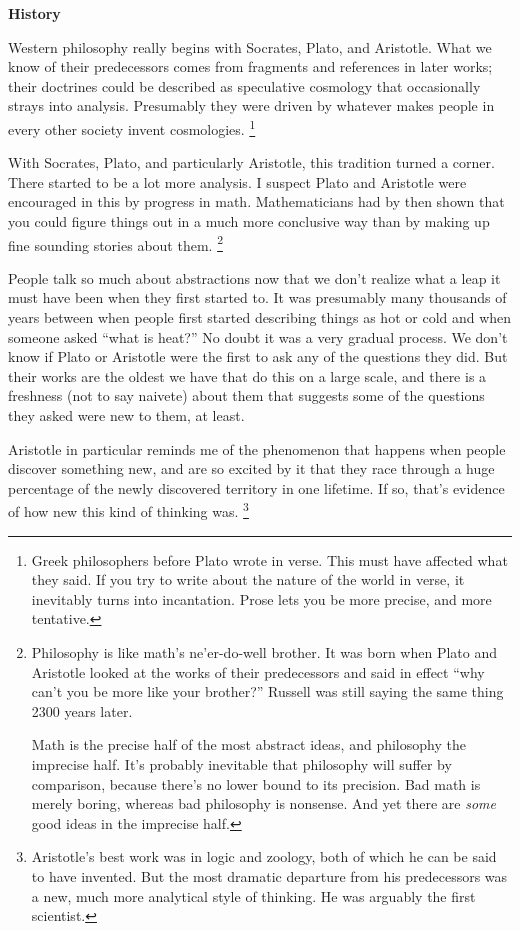 \documentclass[12pt]{book}
\begin{document}
\textbf{History}

Western philosophy really begins with Socrates, Plato, and Aristotle.
What we know of their predecessors comes from fragments and references
in later works; their doctrines could be described as speculative
cosmology that occasionally strays into analysis. Presumably they were
driven by whatever makes people in every other society invent
cosmologies. \footnote{Greek philosophers before Plato wrote in verse. This must have
affected what they said. If you try to write about the nature of the
world in verse, it inevitably turns into incantation. Prose lets you be
more precise, and more tentative.}

With Socrates, Plato, and particularly Aristotle, this tradition turned
a corner. There started to be a lot more analysis. I suspect Plato and
Aristotle were encouraged in this by progress in math. Mathematicians
had by then shown that you could figure things out in a much more
conclusive way than by making up fine sounding stories about them.
\footnote{Philosophy is like math's ne'er-do-well brother. It was born
when Plato and Aristotle looked at the works of their predecessors and
said in effect ``why can't you be more like your brother?'' Russell was
still saying the same thing 2300 years later.

Math is the precise half of the most abstract ideas, and philosophy the
imprecise half. It's probably inevitable that philosophy will suffer by
comparison, because there's no lower bound to its precision. Bad math is
merely boring, whereas bad philosophy is nonsense. And yet there are
\emph{some} good ideas in the imprecise half.}

People talk so much about abstractions now that we don't realize what a
leap it must have been when they first started to. It was presumably
many thousands of years between when people first started describing
things as hot or cold and when someone asked ``what is heat?'' No doubt
it was a very gradual process. We don't know if Plato or Aristotle were
the first to ask any of the questions they did. But their works are the
oldest we have that do this on a large scale, and there is a freshness
(not to say naivete) about them that suggests some of the questions they
asked were new to them, at least.

Aristotle in particular reminds me of the phenomenon that happens when
people discover something new, and are so excited by it that they race
through a huge percentage of the newly discovered territory in one
lifetime. If so, that's evidence of how new this kind of thinking was.
\footnote{Aristotle's best work was in logic and zoology, both of which he
can be said to have invented. But the most dramatic departure from his
predecessors was a new, much more analytical style of thinking. He was
arguably the first scientist.}
\end{document}
